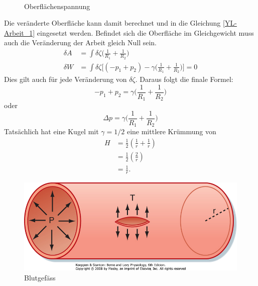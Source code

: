 \begin{refsection}
\begin{equation}
\begin{split}
\end{split}
\end{equation} 
\begin{figure}
  \centering
  \caption{Oberflächenspannung} 
\end{figure}
Die veränderte Oberfläche kann damit berechnet und in die Gleichung \ref{YL-Arbeit_1} eingesetzt werden. Befindet sich die Oberfläche im Gleichgewicht muss auch die Veränderung der Arbeit gleich Null sein.
\begin{equation}
\begin{split}
\delta A &= \int \delta\zeta \bigg( \frac{1}{R_1}+\frac{1}{R_2} \bigg) \\
\delta W &= \int \delta\zeta \bigg[ (-p_1+p_2)-\gamma \bigg( \frac{1}{R_1}+\frac{1}{R_2} \bigg) \bigg] =0
\end{split}
\end{equation}
Dies gilt auch für jede Veränderung von $\delta\zeta$. Daraus folgt die finale Formel:
\begin{equation}
-p_1+p_2 = \gamma\bigg( \frac{1}{R_1}+\frac{1}{R_2} \bigg)
\end{equation}
oder
\begin{equation}\label{Young-Laplace}
\Delta p = \gamma\bigg( \frac{1}{R_1}+\frac{1}{R_2} \bigg)
\end{equation}
Tatsächlich hat eine Kugel mit $\gamma=1/2$ eine mittlere Krümmung von
\begin{equation}
\begin{split}
H &= \frac{1}{2}(\frac{1}{r}+\frac{1}{r}) \\
&= \frac{1}{2}(\frac{2}{r})\\
&=\frac{1}{r}.
\end{split}
\end{equation}
\begin{figure}\label{fig:BlutAder}
  \centering
  \includegraphics[scale=0.3]{minimal/BlutAder.jpg}
  \caption{Blutgefäss} 
\end{figure}


\end{refsection}

